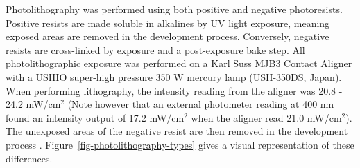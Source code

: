 \documentclass[
  a4paper,
]{scrbook}
\begin{document}
Photolithography was performed using both positive and negative
photoresists. Positive resists are made soluble in alkalines by UV light
exposure, meaning exposed areas are removed in the development process.
Conversely, negative resists are cross-linked by exposure and a
post-exposure bake step. All photolithographic exposure was performed on
a Karl Suss MJB3 Contact Aligner with a USHIO super-high pressure 350 W
mercury lamp (USH-350DS, Japan). When performing lithography, the
intensity reading from the aligner was 20.8 - 24.2 mW/cm\(^2\) (Note
however that an external photometer reading at 400 nm found an intensity
output of 17.2 mW/cm\(^2\) when the aligner read 21.0 mW/cm\(^2\)). The
unexposed areas of the negative resist are then removed in the
development process \autocite{Microchemicals}.
Figure~\ref{fig-photolithography-types} gives a visual representation of
these differences.
\end{document}
